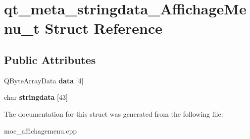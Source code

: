 \hypertarget{structqt__meta__stringdata__AffichageMenu__t}{\section{qt\+\_\+meta\+\_\+stringdata\+\_\+\+Affichage\+Menu\+\_\+t Struct Reference}
\label{structqt__meta__stringdata__AffichageMenu__t}
}
\subsection*{Public Attributes}
\begin{DoxyCompactItemize}
\item 
\hypertarget{structqt__meta__stringdata__AffichageMenu__t_a00a509271c61838a0f782068da0f0dc9}{Q\+Byte\+Array\+Data {\bfseries data} \mbox{[}4\mbox{]}}\label{structqt__meta__stringdata__AffichageMenu__t_a00a509271c61838a0f782068da0f0dc9}

\item 
\hypertarget{structqt__meta__stringdata__AffichageMenu__t_a040ab3479a5309eadb0e8073af2fdaac}{char {\bfseries stringdata} \mbox{[}43\mbox{]}}\label{structqt__meta__stringdata__AffichageMenu__t_a040ab3479a5309eadb0e8073af2fdaac}

\end{DoxyCompactItemize}


The documentation for this struct was generated from the following file\+:\begin{DoxyCompactItemize}
\item 
moc\+\_\+affichagemenu.\+cpp\end{DoxyCompactItemize}
